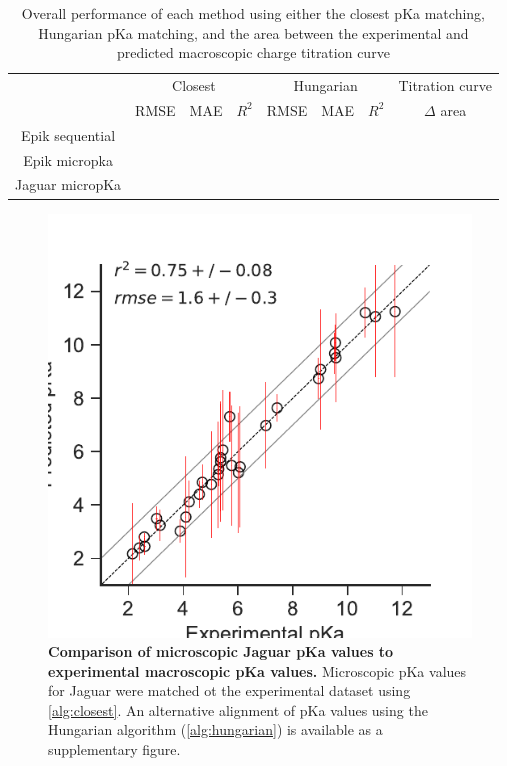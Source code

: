 \documentclass[9pt,lineno,final]{elife}
\begin{document}
\begin{table}[H]
	\centering
	\caption{Overall performance of each method using either the closest pKa matching, Hungarian pKa matching,  and the area between the experimental and predicted macroscopic charge titration curve}
	\label{tab:overview-performance}
	\begin{tabular}{c|ccc|ccc|c}
		& \multicolumn{3}{c|}{Closest} & \multicolumn{3}{c|}{Hungarian} & Titration curve \\ \cline{2-8} 
		                & RMSE & MAE & $R^2$ & RMSE & MAE & $R^2$ & $\Delta $ area \\ \hline
		Epik sequential &      &     &       &      &     &       &           \\
		Epik micropka   &      &     &       &      &     &       &           \\
		Jaguar micropKa &      &     &       &      &     &       &           
	\end{tabular}
\end{table}
    

\begin{figure}[H]
\centering
\includegraphics[]{closest_pka_jaguar_typeI.pdf}
\caption{{\bf Comparison of microscopic Jaguar pKa values to experimental macroscopic pKa values.} Microscopic pKa values for Jaguar were matched ot the experimental dataset using \cref{alg:closest}. An alternative alignment of pKa values using the Hungarian algorithm (\cref{alg:hungarian}) is available as a supplementary figure. \label{correlation-closest-jaguar}}

\end{figure}
\end{document}
